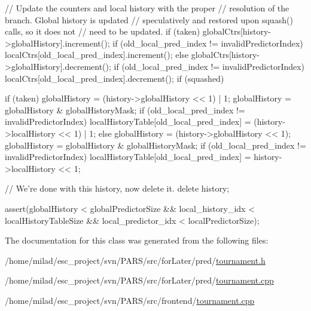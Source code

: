 \begin{DoxyCode}
{{{             // Update the counters and local history with the proper
             // resolution of the branch.  Global history is updated
             // speculatively and restored upon squash() calls, so it does not
             // need to be updated.
             if (taken) {
                  globalCtrs[history->globalHistory].increment();
                  if (old_local_pred_index != invalidPredictorIndex) {
                          localCtrs[old_local_pred_index].increment();
                  }
             } else {
                  globalCtrs[history->globalHistory].decrement();
                  if (old_local_pred_index != invalidPredictorIndex) {
                          localCtrs[old_local_pred_index].decrement();
                  }
             }
        }
        if (squashed) {
             if (taken) {
                globalHistory = (history->globalHistory << 1) | 1;
                globalHistory = globalHistory & globalHistoryMask;
                if (old_local_pred_index != invalidPredictorIndex) {
                    localHistoryTable[old_local_pred_index] =
                     (history->localHistory << 1) | 1;
                }
             } else {
                globalHistory = (history->globalHistory << 1);
                globalHistory = globalHistory & globalHistoryMask;
                if (old_local_pred_index != invalidPredictorIndex) {
                     localHistoryTable[old_local_pred_index] =
                     history->localHistory << 1;
                }
             }

        }
        // We're done with this history, now delete it.
        delete history;

    }

    assert(globalHistory < globalPredictorSize &&
           local_history_idx < localHistoryTableSize &&
           local_predictor_idx < localPredictorSize);


}
\end{DoxyCode}


The documentation for this class was generated from the following files:\begin{DoxyCompactItemize}
\item 
/home/milad/esc\_\-project/svn/PARS/src/forLater/pred/\hyperlink{tournament_8h}{tournament.h}\item 
/home/milad/esc\_\-project/svn/PARS/src/forLater/pred/\hyperlink{forLater_2pred_2tournament_8cpp}{tournament.cpp}\item 
/home/milad/esc\_\-project/svn/PARS/src/frontend/\hyperlink{frontend_2tournament_8cpp}{tournament.cpp}\end{DoxyCompactItemize}
